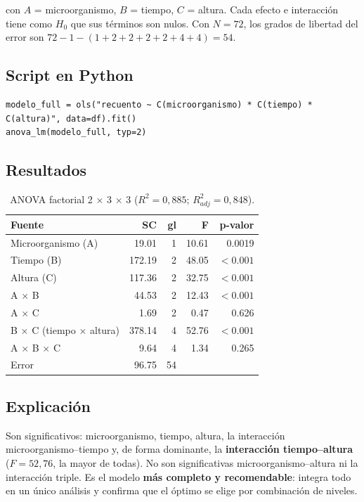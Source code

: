 \documentclass[12pt,a4paper]{article}
\begin{document}
con $A$ = microorganismo, $B$ = tiempo, $C$ = altura. Cada efecto e interacción tiene como $H_0$ que sus términos son nulos. Con $N=72$, los grados de libertad del error son $72-1-(1+2+2+2+2+4+4)=54$.

\subsection{Script en Python}

\begin{lstlisting}[caption={ANOVA factorial 2x3x3 (modelo completo).}]
modelo_full = ols("recuento ~ C(microorganismo) * C(tiempo) * C(altura)", data=df).fit()
anova_lm(modelo_full, typ=2)
\end{lstlisting}

\subsection{Resultados}

\begin{table}[H]
\centering
\caption{ANOVA factorial 2 $\times$ 3 $\times$ 3 ($R^2=0{,}885$; $R^2_{adj}=0{,}848$).}
\begin{tabular}{lrrrr}
\toprule
\textbf{Fuente} & \textbf{SC} & \textbf{gl} & \textbf{F} & \textbf{p-valor}\\
\midrule
Microorganismo (A) & 19.01 & 1 & 10.61 & 0.0019\\
Tiempo (B) & 172.19 & 2 & 48.05 & $<0.001$\\
Altura (C) & 117.36 & 2 & 32.75 & $<0.001$\\
A $\times$ B & 44.53 & 2 & 12.43 & $<0.001$\\
A $\times$ C & 1.69 & 2 & 0.47 & 0.626\\
B $\times$ C (tiempo $\times$ altura) & 378.14 & 4 & 52.76 & $<0.001$\\
A $\times$ B $\times$ C & 9.64 & 4 & 1.34 & 0.265\\
Error & 96.75 & 54 & &\\
\bottomrule
\end{tabular}
\end{table}

\subsection{Explicación}

Son significativos: microorganismo, tiempo, altura, la interacción microorganismo--tiempo y, de forma dominante, la \textbf{interacción tiempo--altura} ($F=52{,}76$, la mayor de todas). No son significativas microorganismo--altura ni la interacción triple. Es el modelo \textbf{más completo y recomendable}: integra todo en un único análisis y confirma que el óptimo se elige por combinación de niveles.
\end{document}

